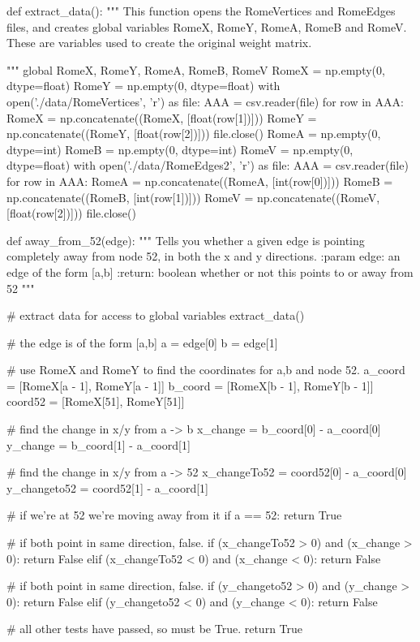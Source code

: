 \documentclass[paper=a4, fontsize=12pt]{scrartcl} %
\numberwithin{equation}{section}       %
\numberwithin{figure}{section}         %
\numberwithin{table}{section}          %
\begin{document}
\begin{python}
def extract_data():
    """
    This function opens the RomeVertices and RomeEdges files, and creates
    global variables RomeX, RomeY, RomeA, RomeB and RomeV. These are variables
    used to create the original weight matrix.

    """
    global RomeX, RomeY, RomeA, RomeB, RomeV
    RomeX = np.empty(0, dtype=float)
    RomeY = np.empty(0, dtype=float)
    with open('./data/RomeVertices', 'r') as file:
        AAA = csv.reader(file)
        for row in AAA:
            RomeX = np.concatenate((RomeX, [float(row[1])]))
            RomeY = np.concatenate((RomeY, [float(row[2])]))
    file.close()
    RomeA = np.empty(0, dtype=int)
    RomeB = np.empty(0, dtype=int)
    RomeV = np.empty(0, dtype=float)
    with open('./data/RomeEdges2', 'r') as file:
        AAA = csv.reader(file)
        for row in AAA:
            RomeA = np.concatenate((RomeA, [int(row[0])]))
            RomeB = np.concatenate((RomeB, [int(row[1])]))
            RomeV = np.concatenate((RomeV, [float(row[2])]))
    file.close()
    
def away_from_52(edge):
    """
    Tells you whether a given edge is pointing completely away from
    node 52, in both the x and y directions.
    :param edge: an edge of the form [a,b]
    :return: boolean whether or not this points to or away from 52
    """

    # extract data for access to global variables
    extract_data()

    # the edge is of the form [a,b]
    a = edge[0]
    b = edge[1]

    # use RomeX and RomeY to find the coordinates for a,b and node 52.
    a_coord = [RomeX[a - 1], RomeY[a - 1]]
    b_coord = [RomeX[b - 1], RomeY[b - 1]]
    coord52 = [RomeX[51], RomeY[51]]

    # find the change in x/y from a -> b
    x_change = b_coord[0] - a_coord[0]
    y_change = b_coord[1] - a_coord[1]

    # find the change in x/y from a -> 52
    x_changeTo52 = coord52[0] - a_coord[0]
    y_changeto52 = coord52[1] - a_coord[1]

    # if we're at 52 we're moving away from it
    if a == 52:
        return True

    # if both point in same direction, false.
    if (x_changeTo52 > 0) and (x_change > 0):
        return False
    elif (x_changeTo52 < 0) and (x_change < 0):
        return False

    # if both point in same direction, false.
    if (y_changeto52 > 0) and (y_change > 0):
        return False
    elif (y_changeto52 < 0) and (y_change < 0):
        return False

    # all other tests have passed, so must be True.
    return True
\end{python}
\end{document}
